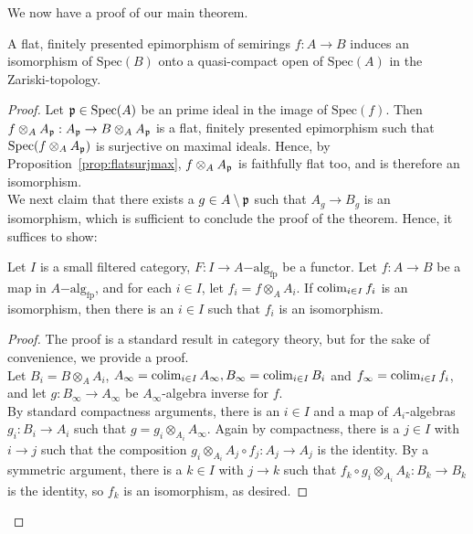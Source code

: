 We now have a proof of our main theorem.
\begin{theorem}\label{theorem:main}
A flat, finitely presented epimorphism of semirings $f: A \to B$ induces an isomorphism of $\text{Spec}(B)$ onto a quasi-compact open of $\text{Spec}(A)$ in the Zariski-topology.
\end{theorem}
\begin{proof}
Let $\mathfrak{p} \in \text{Spec}(A)$ be an prime ideal in the image of $\text{Spec}(f)$. Then $f \otimes_{A} A_{\mathfrak{p}}: A_{\mathfrak{p}} \rightarrow B \otimes_{A} A_{\mathfrak{p}}$ 
is a flat, finitely presented epimorphism such that $\text{Spec}(f \otimes_{A} A_{\mathfrak{p}})$ is surjective on maximal ideals. 
Hence, by Proposition~\ref{prop:flatsurjmax}, $f \otimes_{A} A_{\mathfrak{p}}$ is faithfully flat too, and is therefore an isomorphism.\\
\indent We next claim that there exists a $g \in A \setminus \mathfrak{p}$ such that $A_{g} \to B_g$ is an isomorphism, 
which is sufficient to conclude the proof of the theorem. Hence, it suffices to show:
\begin{claim}\label{claim:main1}
Let $I$ is a small filtered category, $F: I \to A\mathrm{-alg}_{\text{fp}}$ be a functor. 
Let $f: A \to B$ be a map in $A\mathrm{-alg}_{\text{fp}}$, and for each $i \in I$, let $f_i = f \otimes_A A_i$. 
If $\operatorname*{colim}_{i \in I} f_i$ is an isomorphism, then there is an $i \in I$ such that $f_i$ is an isomorphism.
\end{claim}
\begin{proof} 
The proof is a standard result in category theory, but for the sake of convenience, we provide a proof.\\
\indent Let $B_i = B \otimes_A A_i$, $A_{\infty}=\operatorname*{colim}_{i \in I} A_{\infty}, B_{\infty}=\operatorname*{colim}_{i \in I}B_i$ and 
$f_{\infty}=\operatorname*{colim}_{i \in I} f_i$, and let $g: B_{\infty} \to A_{\infty}$ be $A_{\infty}$-algebra inverse for $f$.\\
\indent By standard compactness arguments, there is an $i \in I$ and a map of $A_i$-algebras $g_i: B_i \to A_i$ such that
$g = g_i \otimes_{A_i} A_{\infty}$. Again by compactness, there is a $j \in I$ with $i \to j$ such that the composition
$g_i \otimes_{A_i} A_j \circ f_j: A_j \to A_j$ is the identity. By a symmetric argument, there is a $k \in I$ with $j \to k$ such that
$f_k \circ g_i \otimes_{A_i} A_k: B_k \to B_k$ is the identity, so $f_k$ is an isomorphism, as desired.
\end{proof}
\end{proof}
